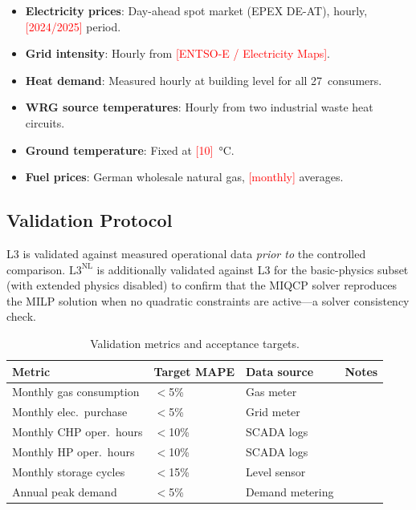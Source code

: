 \documentclass[review,3p]{elsarticle}
\newcommand{\placeholder}[1]{\textcolor{red}{[#1]}}
\newcommand{\Lnl}{\mathrm{L3}^{\mathrm{NL}}}
\begin{document}
\begin{itemize}[nosep]
    \item \textbf{Electricity prices}: Day-ahead spot market
    (EPEX DE-AT), hourly, \placeholder{2024/2025} period.
    \item \textbf{Grid  intensity}: Hourly from
    \placeholder{ENTSO-E / Electricity Maps}.
    \item \textbf{Heat demand}: Measured hourly at building level
    for all 27~consumers.
    \item \textbf{WRG source temperatures}: Hourly from two
    industrial waste heat circuits.
    \item \textbf{Ground temperature}: Fixed at
    \placeholder{10}~\si{\celsius}.
    \item \textbf{Fuel prices}: German wholesale natural gas,
    \placeholder{monthly} averages.
\end{itemize}

\subsection{Validation Protocol}
\label{sec:case_validation}

L3 is validated against measured operational data \emph{prior to}
the controlled comparison. $\Lnl$ is additionally validated against
L3 for the basic-physics subset (with extended physics disabled) to
confirm that the MIQCP solver reproduces the MILP solution when no
quadratic constraints are active---a solver consistency check.

\begin{table}[htbp]
\centering
\caption{Validation metrics and acceptance targets.}
\label{tab:val_targets}
\begin{tabular}{@{}llll@{}}
\toprule
Metric & Target MAPE & Data source & Notes \\
\midrule
Monthly gas consumption  & $<$5\%  & Gas meter & \\
Monthly elec.\ purchase  & $<$5\%  & Grid meter & \\
Monthly CHP oper.\ hours & $<$10\% & SCADA logs & \\
Monthly HP oper.\ hours  & $<$10\% & SCADA logs & \\
Monthly storage cycles   & $<$15\% & Level sensor & \\
Annual peak demand       & $<$5\%  & Demand metering & \\
\bottomrule
\end{tabular}
\end{table}
\end{document}

